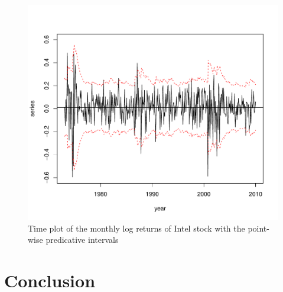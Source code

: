 \documentclass[a4paper,11pt]{article}\usepackage[]{graphicx}\usepackage[]{color}
\makeatletter
\def\maxwidth{ %
  \ifdim\Gin@nat@width>\linewidth
    \linewidth
  \else
    \Gin@nat@width
  \fi
}
\newenvironment{knitrout}{}{} %
\makeatother
\begin{document}
\begin{knitrout}
\color{fgcolor}\begin{figure}
\includegraphics[width=\maxwidth]{figure/predict-intval-1} \caption[Time plot of the monthly log returns of Intel stock with the point-wise predicative intervals]{Time plot of the monthly log returns of Intel stock with the point-wise predicative intervals}\label{fig:predict-intval}
\end{figure}


\end{knitrout}

\section{Conclusion}
\label{sec:conclusion}



\end{document}
